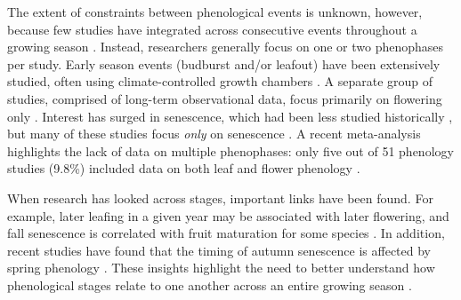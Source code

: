 \documentclass{article}
\begin{document}
\par The extent of constraints between phenological events is unknown, however, because few studies have integrated across consecutive events throughout a growing season \citep{wolkovich2014}. Instead, researchers generally focus on one or two phenophases per study. Early season events (budburst and/or leafout) have been extensively studied, often using climate-controlled growth chambers \citep[e.g.,][]{basler2012,laube2014}. A separate group of studies, comprised of long-term observational data, focus primarily on flowering only  \citep[e.g.,] []{fitter2002,millerrushing2008}. Interest has surged in senescence, which had been less studied historically \citep {parmesan2006}, but many of these studies focus \textit{only} on senescence \citep[e.g.][]{taylor2008,archetti2013,jeong2014}. A recent meta-analysis highlights the lack of data on multiple phenophases: only five out of 51 phenology studies (9.8\%) included data on both leaf and flower phenology \citep{wolkovich2012}. 

\par When research has looked across stages, important links have been found. For example, later  leafing in a given year may be associated with later flowering, and fall senescence is correlated with fruit maturation for some species \citep{lechowicz1995}. In addition, recent studies have found that the timing of autumn senescence is affected by spring phenology \citep {keenan2015,liu2016}. These insights highlight the need to better understand how phenological stages relate to one another across an entire growing season \citep{wolkovich2014}.
\end{document}
